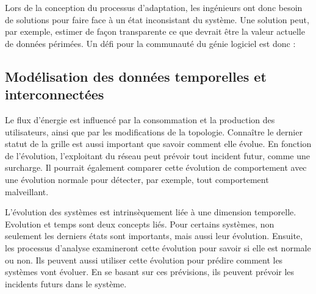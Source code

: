 Lors de la conception du processus d'adaptation, les ingénieurs ont donc besoin de solutions pour faire face à un état inconsistant du système. 
Une solution peut, par exemple, estimer de façon transparente ce que devrait être la valeur actuelle de données périmées. 
Un défi pour la communauté du génie logiciel est donc :
\vspace{-2em}

\subsection{Modélisation des données temporelles et interconnectées}
%
Le flux d'énergie est influencé par la consommation et la production des utilisateurs, ainsi que par les modifications de la topologie. 
Connaître le dernier statut de la grille est aussi important que savoir comment elle évolue.
En fonction de l'évolution, l'exploitant du réseau peut prévoir tout incident futur, comme une surcharge.
Il pourrait également comparer cette évolution de comportement avec une évolution normale pour détecter, par exemple, tout comportement malveillant.

%
L'évolution des systèmes est intrinsèquement liée à une dimension temporelle.
Evolution et temps sont deux concepts liés.
Pour certains systèmes, non seulement les derniers états sont importants, mais aussi leur évolution.
Ensuite, les processus d'analyse examineront cette évolution pour savoir si elle est normale ou non.
Ils peuvent aussi utiliser cette évolution pour prédire comment les systèmes vont évoluer.
En se basant sur ces prévisions, ils peuvent prévoir les incidents futurs dans le système.

